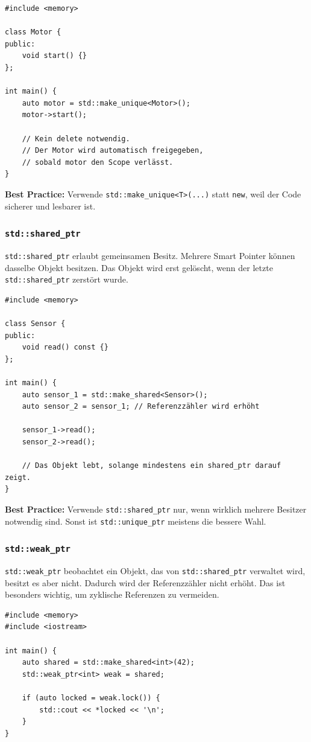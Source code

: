 \documentclass[11pt,a4paper]{article}
\newcommand{\code}[1]{\texttt{#1}}
\newcommand{\important}[1]{\textbf{#1}}
\begin{document}
\begin{lstlisting}[caption={Exklusiver Besitz mit std::unique\_ptr}]
#include <memory>

class Motor {
public:
    void start() {}
};

int main() {
    auto motor = std::make_unique<Motor>();
    motor->start();

    // Kein delete notwendig.
    // Der Motor wird automatisch freigegeben,
    // sobald motor den Scope verlässt.
}
\end{lstlisting}

\important{Best Practice:} Verwende \code{std::make\_unique<T>(...)} statt \code{new}, weil der Code sicherer und lesbarer ist.

\subsubsection{\code{std::shared\_ptr}}
\code{std::shared\_ptr} erlaubt gemeinsamen Besitz. Mehrere Smart Pointer können dasselbe Objekt besitzen. Das Objekt wird erst gelöscht, wenn der letzte \code{std::shared\_ptr} zerstört wurde.

\begin{lstlisting}[caption={Gemeinsamer Besitz mit std::shared\_ptr}]
#include <memory>

class Sensor {
public:
    void read() const {}
};

int main() {
    auto sensor_1 = std::make_shared<Sensor>();
    auto sensor_2 = sensor_1; // Referenzzähler wird erhöht

    sensor_1->read();
    sensor_2->read();

    // Das Objekt lebt, solange mindestens ein shared_ptr darauf zeigt.
}
\end{lstlisting}

\important{Best Practice:} Verwende \code{std::shared\_ptr} nur, wenn wirklich mehrere Besitzer notwendig sind. Sonst ist \code{std::unique\_ptr} meistens die bessere Wahl.

\subsubsection{\code{std::weak\_ptr}}
\code{std::weak\_ptr} beobachtet ein Objekt, das von \code{std::shared\_ptr} verwaltet wird, besitzt es aber nicht. Dadurch wird der Referenzzähler nicht erhöht. Das ist besonders wichtig, um zyklische Referenzen zu vermeiden.

\begin{lstlisting}[caption={Beobachtender Zugriff mit std::weak\_ptr}]
#include <memory>
#include <iostream>

int main() {
    auto shared = std::make_shared<int>(42);
    std::weak_ptr<int> weak = shared;

    if (auto locked = weak.lock()) {
        std::cout << *locked << '\n';
    }
}
\end{lstlisting}
\end{document}
